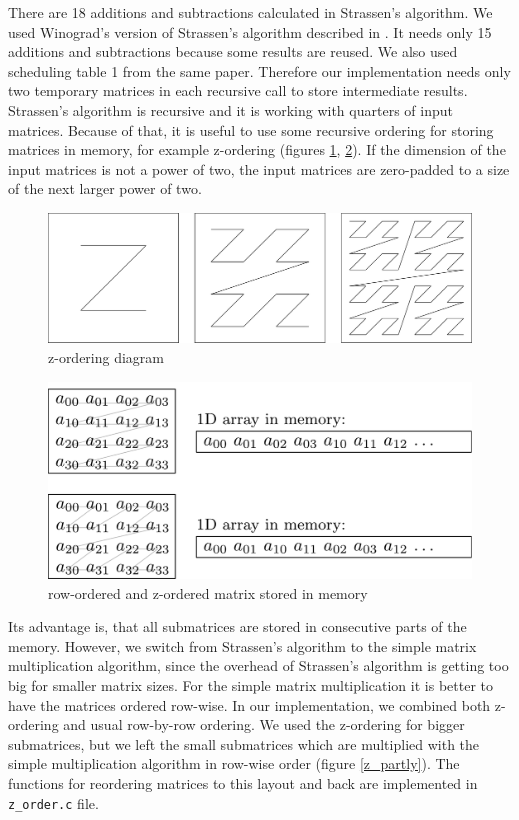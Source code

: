 \documentclass{article}
\begin{document}
There are 18 additions and subtractions calculated in Strassen's algorithm. 
We used Winograd's version of Strassen's algorithm described in \cite{boyer2009memory}.
It needs only 15 additions and subtractions because some results are reused.
We also used scheduling table 1 from the same paper. 
Therefore our implementation needs only two temporary matrices in each recursive call to store intermediate results.
Strassen's algorithm is recursive and it is working with quarters of input matrices. 
Because of that, it is useful to use some recursive ordering for storing matrices in memory, for example z-ordering (figures \ref{z_diagram}, \ref{z_mem}).
If the dimension of the input matrices is not a power of two, the input matrices are zero-padded to a size of the next larger power of two.

\begin{figure}[htbp]
\centerline{\includegraphics[scale=.202]{z_ordering.pdf}}
\caption{z-ordering diagram}
\label{z_diagram}
\end{figure}

\begin{figure}[htbp]
\centerline{\includegraphics[scale=.35]{mem_ordering.pdf}}
\caption{row-ordered and z-ordered matrix stored in memory}
\label{z_mem}
\end{figure}

Its advantage is, that all submatrices are stored in consecutive parts of the memory.
However, we switch from Strassen's algorithm to the simple matrix multiplication algorithm,
since the overhead of Strassen's algorithm is getting too big for smaller matrix sizes.
For the simple matrix multiplication it is better to have the matrices ordered row-wise.
In our implementation, we combined both z-ordering and usual row-by-row ordering.
We used the z-ordering for bigger submatrices, but
we left the small submatrices which are multiplied with the simple multiplication algorithm
in row-wise order (figure \ref{z_partly}). The functions for reordering matrices to this layout
and back are implemented in \texttt{z\_order.c} file.
\end{document}
